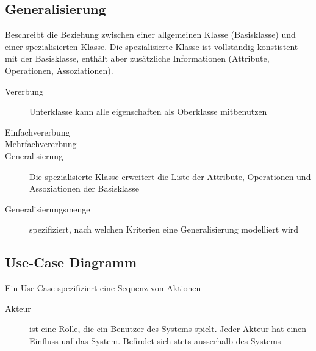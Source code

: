 \subsection{Generalisierung}
Beschreibt die Beziehung zwischen einer allgemeinen Klasse (Basisklasse) und
einer spezialisierten Klasse. Die spezialisierte Klasse ist vollständig
konstistent mit der Basisklasse, enthält aber zusätzliche Informationen
(Attribute, Operationen, Assoziationen).
	\begin{description}
		\item[Vererbung] Unterklasse kann alle eigenschaften als Oberklasse
		mitbenutzen
		\item[Einfachvererbung]
		\item[Mehrfachvererbung]
		\item[Generalisierung] Die spezialisierte Klasse erweitert die Liste der
		Attribute, Operationen und Assoziationen der Basisklasse
		\item[Generalisierungsmenge] spezifiziert, nach welchen Kriterien eine
		Generalisierung modelliert wird
	\end{description}
	
\subsection{Use-Case Diagramm}
	Ein Use-Case spezifiziert eine Sequenz von Aktionen
	\begin{description}
		\item[Akteur] ist eine Rolle, die ein Benutzer des Systems spielt. Jeder
		Akteur hat einen Einfluss uaf das System. Befindet sich stets ausserhalb des Systems\\
	\end{description}
